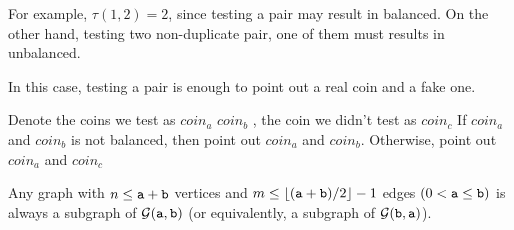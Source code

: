 For example, $\tau(1,2)=2$, since testing a pair may result in balanced. On the other hand, testing two non-duplicate pair, one of them must results in unbalanced.

In this case, testing a pair is enough to point out a real coin and a fake one. 

Denote the coins we test as $coin_a$ $coin_b$ , the coin we didn't test as $coin_c$
If $coin_a$ and $coin_b$ is not balanced, then point out $coin_a$ and $coin_b$. Otherwise, point out $coin_a$ and $coin_c$

\begin{theorem}
Any graph with $n \leq \mathtt{a} + \mathtt{b}$ vertices and $m \leq \lfloor (\mathtt{a}+\mathtt{b})/2 \rfloor-1$ edges $(0<\mathtt{a} \leq \mathtt{b})$ 
is always a subgraph of ${\cal G}(\mathtt{a},\mathtt{b})$ (or equivalently, a subgraph of ${\cal G}(\mathtt{b},\mathtt{a})$).
\end{theorem}

